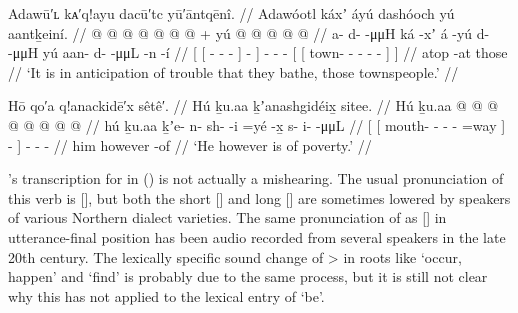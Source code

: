 \ex\label{ex:93-4-bathe-for-trouble}%
%
\begingl
	\glpreamble	Adawū′ʟ kᴀ′q!ayu dacū′tc yū′āntqēnî. //
	\glpreamble	Adawóotl káxʼ áyú dashóoch yú aantḵeiní. //
	\gla	{} {}  @ {} @ {} @ {} {}  @ {} {}
		 @ {}
		 @ {} @ {} +
		{} yú {}  @ {} @ {} @ {} @ {} @ {} {} {} //
	\glb	{} {} a- d-  -μμH {} ká -xʼ {}
		á -yú
		d-  -μμH
		{} yú {} aan- d-  -μμL -n -í {} //
	\glc	{}[ {}[ - -  - {}]  - {}]
		 -
		-  -
		{}[  {}[ town- -  - - - {}] {}] //
	\gld	{} {}  {} {} {} {} atop -at {}
		 {}
		 {} {}
		{} those {}  {} {} {} {} {} {} {} //
	\glft	‘It is in anticipation of trouble that they bathe, those townspeople.’
		//
\endgl
\xe


\ex\label{ex:93-5-he-is-of-poverty}%
%
\begingl
	\glpreamble	Hō qo′a q!anackidē′x sêtê′. //
	\glpreamble	Hú ḵu.aa ḵʼanashgidéix̱ sitee. //
	\gla	Hú ḵu.aa
		{} {}  @ {} @ {} @ {} @ {} @ {} {} {} {}
		 @ {} @ {} @ {} //
	\glb	hú ḵu.aa
		{} {} ḵʼe- n- sh-  -i =yé {} -x̱ {}
		s- i-  -μμL //
	\glc	{} 
		{}[ {}[ mouth- - -  - =way {}] - {}]
		- -  - //
	\gld	him however
		{} {}  {} {} {} {} {} {} -of {}
		 {} {} {} //
	\glft	‘He however is of poverty.’
		//
\endgl
\xe

\citeauthor{swanton:1909}’s transcription  for  in (\lastx) is not actually a mishearing.
The usual pronunciation of this verb is  [], but both the short [] and long [] are sometimes lowered by speakers of various Northern dialect varieties.
The same pronunciation of  as [] in utterance-final position has been audio recorded from several speakers in the late 20th century.
The lexically specific sound change of  >  in roots like  ‘occur, happen’ and  ‘find’ is probably due to the same process, but it is still not clear why this has not applied to the lexical entry of  ‘be’.


